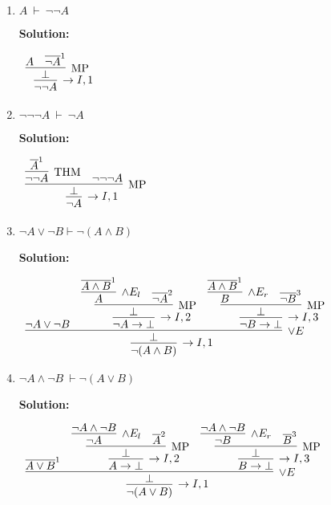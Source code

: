 \documentclass[11pt]{report}
\newcommand{\temp}[2]{{\overline{#2}}^{#1}}
\begin{document}
\begin{enumerate}
\begin{enumerate}
		\item $A \ \vdash \ \lnot\lnot A$
		
		\textbf{Solution:}

		\begin{center}
			$\begin{array}{c}
				\infer[\to I, 1]{\lnot \lnot A}
					{\infer[\MP]{\bot}
						{A
						&
						\temp{1}{\lnot A}}}
			\end{array}$
		\end{center}

		\item $\lnot \lnot \lnot A \ \vdash \ \lnot A$
		
		\textbf{Solution:}

		\begin{center}
			$\begin{array}{c}
				\infer[\to I, 1]{\lnot A}
					{\infer[\MP]{\bot}
						{\infer[\THM]{\lnot \lnot A}{\temp{1}{A}}
						&
						\lnot \lnot \lnot A}}
			\end{array}$
		\end{center}

		\item $\lnot A \lor \lnot B \vdash \lnot(A \land B)$
		
		\textbf{Solution:}

		\begin{center}
			$\begin{array}{c}
				\infer[\to I, 1]{\lnot (A \land B)}
					{\infer[\lor E]{\bot}
						{\lnot A \lor \lnot B
						&
						\infer[\to I, 2]{\lnot A \to \bot}
							{\infer[\MP]{\bot}
								{\infer[\land E_{l}]{A}{\temp{1}{A \land B}}
								&
								\temp{2}{\lnot A}}}
						&
						\infer[\to I, 3]{\lnot B \to \bot}
							{\infer[\MP]{\bot}
								{\infer[\land E_{r}]{B}{\temp{1}{A \land B}}
								&
								\temp{3}{\lnot B}}}}}
			\end{array}$
		\end{center}

		\item $\lnot A \land \lnot B \ \vdash \lnot(A \lor B)$
		
		\textbf{Solution:}

		\begin{center}
			$\begin{array}{c}
				\infer[\to I, 1]{\lnot(A \lor B)}
					{\infer[\lor E]{\bot}
						{\temp{1}{A \lor B}
						&
						\infer[\to I, 2]{A \to \bot}
							{\infer[\MP]{\bot}
								{\infer[\land E_{l}]{\lnot A}
									{\lnot A \land \lnot B}
								&
								\temp{2}{A}}}
						&
						\infer[\to I, 3]{B \to \bot}
							{\infer[\MP]{\bot}
								{\infer[\land E_{r}]{\lnot B}
									{\lnot A \land \lnot B}
								&
								\temp{3}{B}}}}}
			\end{array}$
		\end{center}


\end{enumerate}
\end{enumerate}
\end{document}
